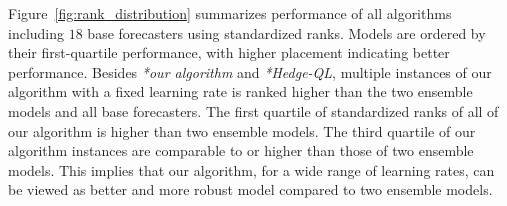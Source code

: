 Figure~\ref{fig:rank_distribution} summarizes performance of all algorithms including $18$ base forecasters using standardized ranks. Models are ordered by their first-quartile performance, with higher placement indicating better performance. 
Besides \textit{*our algorithm} and \textit{*Hedge-QL}, multiple instances of our algorithm with a fixed learning rate is ranked higher than the two ensemble models and all base forecasters. 
The first quartile of standardized ranks of all of our algorithm is higher than two ensemble models. The third quartile of our algorithm instances are comparable to or higher than those of two ensemble models. This implies that our algorithm, for a wide range of learning rates, can be viewed as better and more robust model compared to two ensemble models.